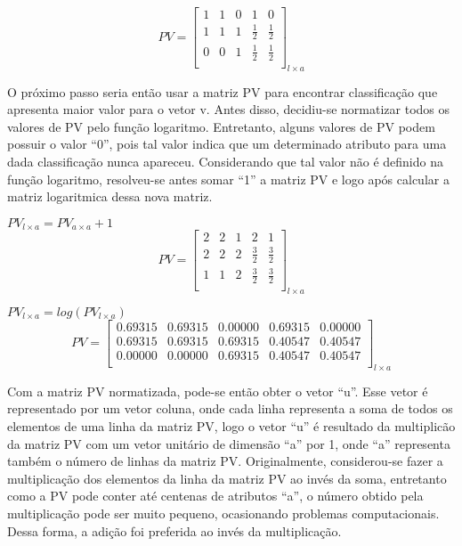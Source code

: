 \begin{anexosenv}
$$PV=\left[
\begin{array}{ccccc}
1 & 1 & 0 & 1 & 0 \\
1 & 1 & 1 & \frac{1}{2} & \frac{1}{2} \\
0 & 0 & 1 & \frac{1}{2} & \frac{1}{2} \\
\end{array}
\right]_{l \times a}$$

O próximo passo seria então usar a matriz PV para encontrar classificação que
apresenta maior valor para o vetor v. Antes disso, decidiu-se normatizar todos
os valores de PV pelo função logaritmo. Entretanto, alguns valores de PV podem
possuir o valor ``0'', pois tal valor indica que um determinado atributo para
uma dada classificação nunca apareceu. Considerando que tal valor não é
definido na função logaritmo, resolveu-se antes somar ``1'' a matriz PV e logo
após calcular a matriz logaritmica dessa nova matriz.

\begin{center}
$PV_{l \times a} = PV_{a \times a} + 1$
$$PV=\left[
\begin{array}{ccccc}
2 & 2 & 1 & 2 & 1 \\
2 & 2 & 2 & \frac{3}{2} & \frac{3}{2} \\
1 & 1 & 2 & \frac{3}{2} & \frac{3}{2} \\
\end{array}
\right]_{l \times a}$$
\end{center}

\begin{center}
$PV_{l \times a} = log(PV_{l \times a})$
$$PV=\left[
\begin{array}{ccccc}
0.69315 & 0.69315 & 0.00000 & 0.69315 & 0.00000 \\
0.69315 & 0.69315 & 0.69315 & 0.40547 & 0.40547 \\
0.00000 & 0.00000 & 0.69315 & 0.40547 & 0.40547 \\
\end{array}
\right]_{l \times a}$$
\end{center}

Com a matriz PV normatizada, pode-se então obter o vetor ``u''. Esse vetor é
representado por um vetor coluna, onde cada linha representa a soma de todos os
elementos de uma linha da matriz PV, logo o vetor ``u'' é resultado da multiplicão
da matriz PV com um vetor unitário de dimensão ``a'' por 1, onde ``a'' representa
também o número de linhas da matriz PV. Originalmente, considerou-se fazer a
multiplicação dos elementos da linha da matriz PV ao invés da soma, entretanto
como a PV pode conter até centenas de atributos ``a'', o número obtido pela
multiplicação pode ser muito pequeno, ocasionando problemas computacionais.
Dessa forma, a adição foi preferida ao invés da multiplicação.


\end{anexosenv}
